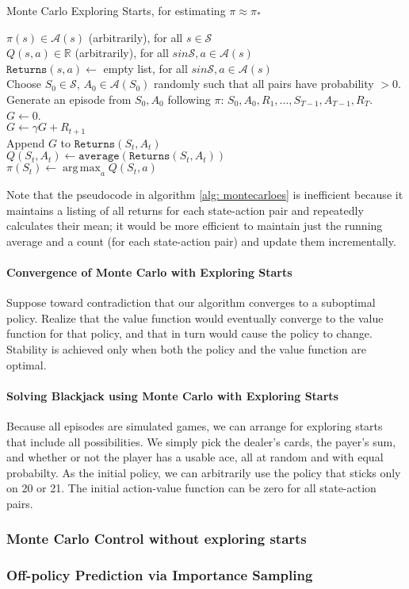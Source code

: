 \documentclass[12pt]{article}
\DeclareMathOperator*{\argmax}{arg\,max}
\begin{document}
\begin{algorithm}[h]
  \caption{Monte Carlo Exploring Starts, for estimating $\pi \approx \pi_*$}
  $\pi(s) \in \mathcal A(s)$ (arbitrarily), for all $s \in \mathcal S$ \\
  $Q(s,a) \in \mathbb R$ (arbitrarily), for all $s in \mathcal S, a \in \mathcal   A(s)$ \\
  $\texttt{Returns}(s,a) \gets$ empty list, for all $s in \mathcal S, a \in   \mathcal   A(s)$ \\
 {
  Choose $S_0 \in \mathcal S$, $A_0 \in \mathcal A(S_0)$ randomly such that all   pairs have probability $>0$. \\
  Generate an episode from $S_0, A_0$ following $\pi$: $S_0, A_0, R_1, \ldots,   S_{T-1}, A_{T-1}, R_T$.\\
  $G \gets 0$. \\
   {
    $G \gets \gamma G + R_{t+1}$ \\
     {
Append $G$ to $\texttt{Returns}(S_t, A_t)$ \\
$Q(S_t, A_t) \gets \texttt{average}(\texttt{Returns}(S_t, A_t))$ \\
$\pi(S_t) \gets \argmax_a Q(S_t, a)$
    }
  }
}
\label{alg: montecarloes}
\end{algorithm}
Note that the pseudocode in algorithm \ref{alg: montecarloes} is inefficient because it maintains a listing of all returns for each state-action pair and repeatedly calculates their mean; it would be more efficient to maintain just the running average and a count (for each state-action pair) and update them incrementally.

\paragraph{Convergence of Monte Carlo with Exploring Starts}
Suppose toward contradiction that our algorithm converges to a suboptimal policy. Realize that the value function would eventually converge to the value function for that policy, and that in turn would cause the policy to change. Stability is achieved only when both the policy and the value function are optimal.

\paragraph{Solving Blackjack using Monte Carlo with Exploring Starts} Because all episodes are simulated games, we can arrange for exploring starts that include all possibilities. We simply pick the dealer's cards, the payer's sum, and whether or not the player has a usable ace, all at random and with equal probabilty. As the initial policy, we can arbitrarily use the policy that sticks only on 20 or 21. The initial action-value function can be zero for all state-action pairs. 

\subsubsection{Monte Carlo Control without exploring starts}


\subsubsection{Off-policy Prediction via Importance Sampling}
\end{document}
